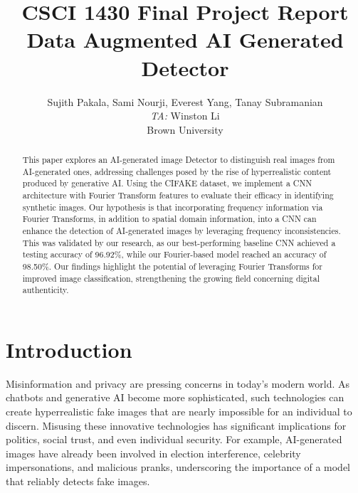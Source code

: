 \title{CSCI 1430 Final Project Report\\Data Augmented AI Generated Detector}

\author{Sujith Pakala, Sami Nourji, Everest Yang, Tanay Subramanian\\
    \emph{TA:} Winston Li \\
    Brown University\\
}

\maketitle

\begin{abstract}
    This paper explores an AI-generated image Detector to distinguish real images from AI-generated ones, addressing challenges posed by the rise of hyperrealistic content produced by generative AI. Using the CIFAKE dataset, we implement a CNN architecture with Fourier Transform features to evaluate their efficacy in identifying synthetic images. Our hypothesis is that incorporating frequency information via Fourier Transforms, in addition to spatial domain information, into a CNN can enhance the detection of AI-generated images by leveraging frequency inconsistencies. This was validated by our research, as our best-performing baseline CNN achieved a testing accuracy of 96.92\%, while our Fourier-based model reached an accuracy of 98.50\%. Our findings highlight the potential of leveraging Fourier Transforms for improved image classification, strengthening the growing field concerning digital authenticity.\end{abstract}

\section{Introduction}

Misinformation and privacy are pressing concerns in today’s modern world. As chatbots and generative AI become more sophisticated, such technologies can create hyperrealistic fake images that are nearly impossible for an individual to discern. Misusing these innovative technologies has significant implications for politics, social trust, and even individual security. For example, AI-generated images have already been involved in election interference, celebrity impersonations, and malicious pranks, underscoring the importance of a model that reliably detects fake images.


